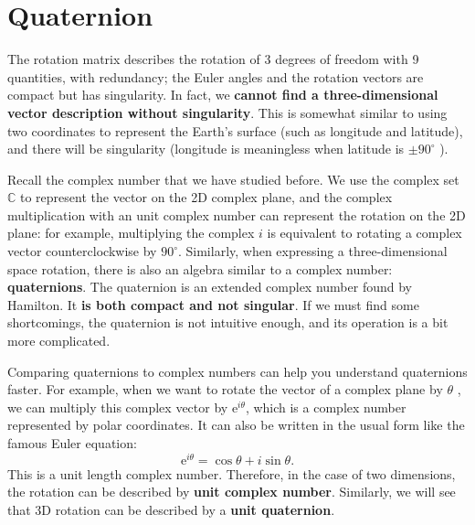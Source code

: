 \section{Quaternion}

The rotation matrix describes the rotation of 3 degrees of freedom with 9 quantities, with redundancy; the Euler angles and the rotation vectors are compact but has singularity. In fact, we \textbf{cannot find a three-dimensional vector description without singularity}\cite{Stuelpnagel1964}. This is somewhat similar to using two coordinates to represent the Earth's surface (such as longitude and latitude), and there will be singularity (longitude is meaningless when latitude is $ \pm  90 ^ \circ $ ).

Recall the complex number that we have studied before. We use the complex set $ \mathbb {C} $ to represent the vector on the 2D complex plane, and the complex multiplication with an unit complex number can represent the rotation on the 2D plane: for example, multiplying the complex $i$ is equivalent to rotating a complex vector counterclockwise by $ 90 ^ \circ $. Similarly, when expressing a three-dimensional space rotation, there is also an algebra similar to a complex number: \textbf{quaternions}. The quaternion is an extended complex number found by Hamilton. It \textbf{ is both compact and not singular}. If we must find some shortcomings, the quaternion is not intuitive enough, and its operation is a bit more complicated.

Comparing quaternions to complex numbers can help you understand quaternions faster. For example, when we want to rotate the vector of a complex plane by $\theta$ , we can multiply this complex vector by $\mathrm{e}^{i \theta}$, which is a complex number represented by polar coordinates. It can also be written in the usual form like the famous Euler equation:
\begin{equation}
\mathrm{e}^{i\theta} = \cos \theta + i \sin \theta.
\end{equation}
This is a unit length complex number. Therefore, in the case of two dimensions, the rotation can be described by \textbf{unit complex number}. Similarly, we will see that 3D rotation can be described by a \textbf{unit quaternion}.

